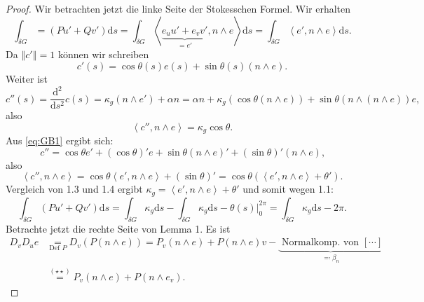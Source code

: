 \begin{theorem}
\begin{proof}
    Wir betrachten jetzt die linke Seite der Stokesschen Formel. Wir erhalten
    \begin{equation}\label{eq:GB1}
      \int_{\delta G} = (Pu' + Qv')\text{d}s = \int_{\delta G}\left\langle \underbrace{e_uu' + e_vv'}_{=e'}, n \wedge e \right\rangle \text{d}s = \int_{\delta G}\left\langle e', n \wedge e \right\rangle \text{d}s\text{.}
    \end{equation}
    Da $ \left\Vert c' \right\Vert = 1 $ können wir schreiben
    \begin{equation}\label{eq:GB2}
      c'(s) = \cos\theta(s)e(s) + \sin\theta(s)(n \wedge e)\text{.}
    \end{equation}
    Weiter ist
    \begin{equation*}
      c''(s) = \frac{\text{d}^2}{\text{d}s^2}c(s) = \kappa_g(n \wedge e') + \alpha n = \alpha n + \kappa_g(\cos\theta(n \wedge e)) + \sin\theta(n \wedge (n \wedge e))e\text{,}
    \end{equation*}
    also
    \begin{equation}\label{eq:GB3}
      \left\langle c'', n \wedge e \right\rangle = \kappa_g\cos\theta\text{.}
    \end{equation}
    Aus \autoref{eq:GB1} ergibt sich:
    \begin{equation*}
      c'' = \cos\theta e' + (\cos\theta)'e + \sin\theta(n \wedge e)' + (\sin\theta)'(n\wedge e)\text{,}
    \end{equation*}
    also
    \begin{equation}\label{eq:GB4}
      \left\langle c'', n \wedge e \right\rangle = \cos\theta \left\langle e', n \wedge e \right\rangle + (\sin\theta)' = \cos\theta\left(\left\langle e', n \wedge e \right\rangle + \theta'\right)\text{.}
    \end{equation}
    Vergleich von 1.3 und 1.4 ergibt $ \kappa_g = \left\langle e', n \wedge e \right\rangle + \theta' $ und somit wegen 1.1:
    \begin{equation*}
      \int_{\delta G}(Pu' + Qv')\text{d}s = \int_{\delta G}\kappa_g\text{d}s - \int_{\delta G}\kappa_g\text{d}s - \theta(s)\vert_{0}^{2\pi} = \int_{\delta G}\kappa_g\text{d}s - 2\pi\text{.}
    \end{equation*}
    Betrachte jetzt die rechte Seite von Lemma 1. Es ist
    \begin{align*}
      D_vD_u e &\underset{\text{Def }P}{=}D_v(P(n \wedge e)) = P_v(n \wedge e) + P(n\wedge e)v - \underbrace{\text{ Normalkomp. von } [\cdots]}_{\eqqcolon \beta_n} \\ &\overset{(\star\star)}{=} P_v(n \wedge e) + P(n \wedge e_v)\text{.}

\end{align*}
\end{proof}
\end{theorem}
